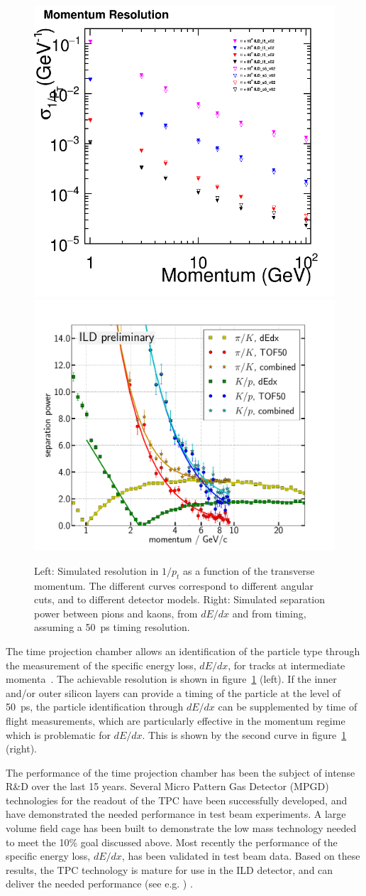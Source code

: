 \documentclass[%
 amsmath,amssymb,
 aps,
]{revtex4-1}
\begin{document}
\begin{figure}
    \centering
    \includegraphics[width=0.38\hsize]{figures/PResolution_ILD_ls5_v02.png}
        \includegraphics[width=0.45\hsize]{figures/Combined_dEdx_TOF50.pdf}
    \caption{ Left: Simulated resolution in $1/p_t$ as a function of the transverse momentum. The different curves correspond to different angular cuts, and to different detector models. Right: Simulated separation power between pions and kaons, from $dE/dx$ and from timing, assuming a 50~ps timing resolution.}
    \label{fig:momentumvsp}
\end{figure}

The time projection chamber allows an identification of the particle type through the measurement of the specific energy loss, $dE/dx$, for tracks at intermediate momenta~\cite{Hauschild:2000eg}. The achievable resolution is shown in figure~\ref{fig:momentumvsp} (left). If the inner and/or outer silicon layers can provide a timing of the particle at the level of 50~ps, the particle identification through $dE/dx$ can be supplemented by time of flight measurements, which are particularly effective in the momentum regime which is problematic for $dE/dx$. This is shown by the second curve in figure~\ref{fig:momentumvsp} (right). 

The performance of the time projection chamber has been the subject of intense R\&D over the last 15 years. Several Micro Pattern Gas Detector (MPGD) technologies for the readout of the TPC have been successfully developed, and have demonstrated the needed performance in test beam experiments. A large volume field cage has been built to demonstrate the low mass technology needed to meet the 10\% goal discussed above. Most recently the performance of the specific energy loss, $dE/dx$, has been validated in test beam data. Based on these results, the TPC technology is mature for use in the ILD detector, and can deliver the needed performance (see e.g. \cite{Attie:2016yeu, Bouchez:2007pe}) . 
\end{document}
